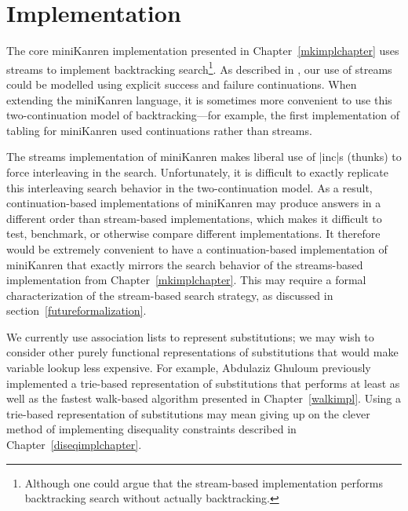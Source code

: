

\section{Implementation}\label{futureimplementation}

The core miniKanren implementation presented in
Chapter~\ref{mkimplchapter} uses streams to implement backtracking
search\footnote{Although one could argue that the stream-based
  implementation performs backtracking search without actually
  backtracking.}.  As described in \citet{Wand04relatingmodels}, our
use of streams could be modelled using explicit success and failure
continuations.  When extending the miniKanren language, it is
sometimes more convenient to use this two-continuation model of
backtracking---for example, the first implementation of tabling for
miniKanren used continuations rather than streams.

The streams implementation of miniKanren makes liberal use of
\scheme|inc|s (thunks) to force interleaving in the search.
Unfortunately, it is difficult to exactly replicate this interleaving
search behavior in the two-continuation model.  As a result,
continuation-based implementations of miniKanren may produce answers
in a different order than stream-based implementations, which makes it
difficult to test, benchmark, or otherwise compare different
implementations.  It therefore would be extremely convenient to have a
continuation-based implementation of miniKanren that exactly mirrors
the search behavior of the streams-based implementation from
Chapter~\ref{mkimplchapter}.  This may require a formal
characterization of the stream-based search strategy, as discussed in
section~\ref{futureformalization}.

We currently use association lists to represent substitutions; we may
wish to consider other purely functional representations of
substitutions that would make variable lookup less expensive.  For
example, Abdulaziz Ghuloum previously implemented a trie-based
representation of substitutions that performs at least as well as the
fastest walk-based algorithm presented in
Chapter~\ref{walkimpl}. Using a trie-based representation of
substitutions may mean giving up on the clever method of implementing
disequality constraints described in Chapter~\ref{diseqimplchapter}.

